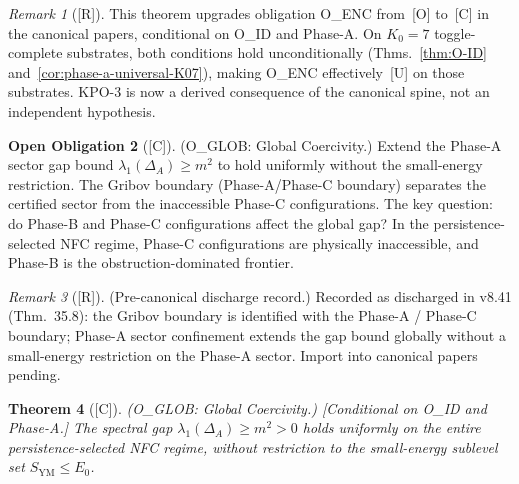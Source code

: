 \documentclass[12pt,oneside]{amsbook}
\theoremstyle{plain}
\newtheorem{theorem}{Theorem}[section]
\theoremstyle{definition}
\newtheorem{obligation}[theorem]{Open Obligation}
\theoremstyle{remark}
\newtheorem{remark}[theorem]{Remark}
\newcommand{\status}[1]{\textup{[#1]}}
\begin{document}
\begin{remark}[\status{R}]
This theorem upgrades obligation O\_ENC from~[O] to~[C] in the
canonical papers, conditional on O\_ID and Phase-A. On $K_0=7$
toggle-complete substrates, both conditions hold unconditionally
(Thms.~\ref{thm:O-ID} and~\ref{cor:phase-a-universal-K07}),
making O\_ENC effectively~[U] on those substrates.
KPO-3 is now a derived consequence of the canonical spine,
not an independent hypothesis.
\end{remark}

\begin{obligation}[\status{C}]\label{ob:O-GLOB}
\textup{(O\_GLOB: Global Coercivity.)}
Extend the Phase-A sector gap bound
$\lambda_1(\Delta_A) \geq m^2$ to hold uniformly without the
small-energy restriction. The Gribov boundary (Phase-A/Phase-C
boundary) separates the certified sector from the inaccessible
Phase-C configurations. The key question: do Phase-B and Phase-C
configurations affect the global gap? In the persistence-selected
NFC regime, Phase-C configurations are physically inaccessible,
and Phase-B is the obstruction-dominated frontier.
\end{obligation}
\begin{remark}[\status{R}]
\textup{(Pre-canonical discharge record.)} Recorded as discharged in v8.41 (Thm.~35.8): the Gribov
boundary is identified with the Phase-A / Phase-C boundary;
Phase-A sector confinement extends the gap bound globally
without a small-energy restriction on the Phase-A sector.
Import into canonical papers pending.
\end{remark}

\begin{theorem}[\status{C}]\label{thm:O-GLOB}
\textup{(O\_GLOB: Global Coercivity.)}
\textup{[Conditional on O\_ID and Phase-A.]}\;
The spectral gap $\lambda_1(\Delta_A) \geq m^2 > 0$ holds uniformly
on the \emph{entire} persistence-selected NFC regime, without
restriction to the small-energy sublevel set $S_{\mathrm{YM}}
\leq E_0$.
\end{theorem}
\end{document}
